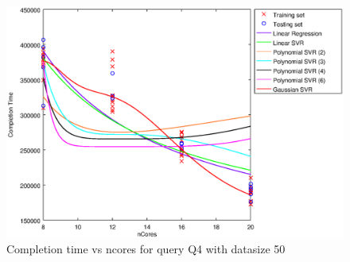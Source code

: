 
\begin {figure}[hbtp]
\centering
\includegraphics[width=\textwidth]{output/Q4_50_ONLY_1_OVER_NCORES/plot_Q4_50.eps}
\caption{Completion time vs ncores for query Q4 with datasize 50}
\label{fig:all_linear_Q4_50}
\end {figure}
